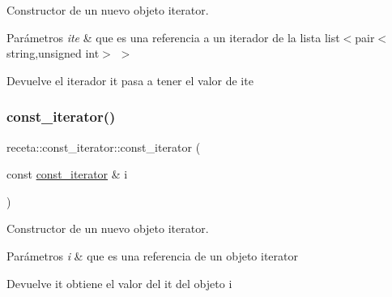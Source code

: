 Constructor de un nuevo objeto iterator. 


\begin{DoxyParams}{Parámetros}
{\em ite} & que es una referencia a un iterador de la lista list$<$pair$<$string,unsigned int$>$ $>$ \\
\hline
\end{DoxyParams}
\begin{DoxyReturn}{Devuelve}
el iterador it pasa a tener el valor de ite 
\end{DoxyReturn}
\mbox{\label{classreceta_1_1const__iterator_adf7052a9c620f7120d7d56c64985a932}} 
\subsubsection{\texorpdfstring{const\+\_\+iterator()}{const\_iterator()}\hspace{0.1cm}{\footnotesize\ttfamily [3/3]}}
{\footnotesize\ttfamily receta\+::const\+\_\+iterator\+::const\+\_\+iterator (\begin{DoxyParamCaption}\item[{const \hyperlink{classreceta_1_1const__iterator}{const\+\_\+iterator} \&}]{i }\end{DoxyParamCaption})\hspace{0.3cm}{\ttfamily [inline]}}



Constructor de un nuevo objeto iterator. 


\begin{DoxyParams}{Parámetros}
{\em i} & que es una referencia de un objeto iterator \\
\hline
\end{DoxyParams}
\begin{DoxyReturn}{Devuelve}
it obtiene el valor del it del objeto i 
\end{DoxyReturn}
\mbox{\label{classreceta_1_1const__iterator_a7533f928c728561f182dc98ac9e049a5}} 
